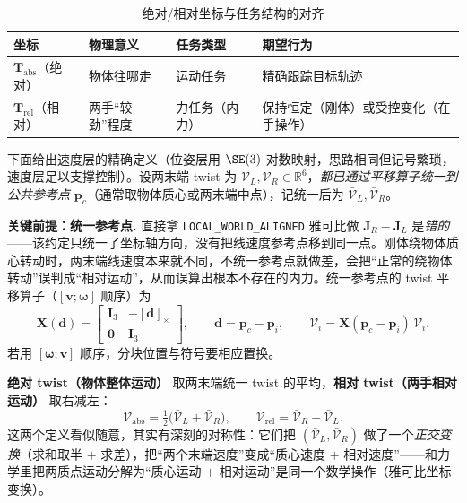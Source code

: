 \begin{table}[H]\centering\small
\caption{绝对/相对坐标与任务结构的对齐}
\label{tab:ma-absrel}
\begin{tabular}{llll}
\toprule
坐标 & 物理意义 & 任务类型 & 期望行为 \\
\midrule
$\mathbf{T}_{\text{abs}}$（绝对） & 物体往哪走 & 运动任务 & 精确跟踪目标轨迹 \\
$\mathbf{T}_{\text{rel}}$（相对） & 两手“较劲”程度 & 力任务（内力） & 保持恒定（刚体）或受控变化（在手操作） \\
\bottomrule
\end{tabular}
\end{table}

下面给出速度层的精确定义（位姿层用 $\SE(3)$ 对数映射，思路相同但记号繁琐，速度层足以支撑控制）。设两末端 twist 为 $\boldsymbol{\mathcal{V}}_L,\boldsymbol{\mathcal{V}}_R\in\mathbb{R}^6$，\emph{都已通过平移算子统一到公共参考点} $\mathbf{p}_c$（通常取物体质心或两末端中点），记统一后为 $\bar{\boldsymbol{\mathcal{V}}}_L,\bar{\boldsymbol{\mathcal{V}}}_R$。

\begin{note}
\textbf{关键前提：统一参考点.}\;
直接拿 \verb|LOCAL_WORLD_ALIGNED| 雅可比做 $\mathbf{J}_R-\mathbf{J}_L$ 是\emph{错的}——该约定只统一了坐标轴方向，没有把线速度参考点移到同一点。刚体绕物体质心转动时，两末端线速度本来就不同，不统一参考点就做差，会把“正常的绕物体转动”误判成“相对运动”，从而误算出根本不存在的内力。统一参考点的 twist 平移算子（$[\mathbf{v};\boldsymbol{\omega}]$ 顺序）为
\[
  \mathbf{X}(\mathbf{d})=\begin{bmatrix}\mathbf{I}_3 & -[\mathbf{d}]_\times\\ \mathbf{0} & \mathbf{I}_3\end{bmatrix},\qquad
  \mathbf{d}=\mathbf{p}_c-\mathbf{p}_i,\qquad \bar{\boldsymbol{\mathcal{V}}}_i=\mathbf{X}(\mathbf{p}_c-\mathbf{p}_i)\,\boldsymbol{\mathcal{V}}_i.
\]
若用 $[\boldsymbol{\omega};\mathbf{v}]$ 顺序，分块位置与符号要相应置换。
\end{note}

\textbf{绝对 twist（物体整体运动）} 取两末端统一 twist 的平均，\textbf{相对 twist（两手相对运动）} 取右减左：
\begin{equation}
  \boldsymbol{\mathcal{V}}_{\text{abs}}=\tfrac12\big(\bar{\boldsymbol{\mathcal{V}}}_L+\bar{\boldsymbol{\mathcal{V}}}_R\big),
  \qquad
  \boldsymbol{\mathcal{V}}_{\text{rel}}=\bar{\boldsymbol{\mathcal{V}}}_R-\bar{\boldsymbol{\mathcal{V}}}_L.
  \label{eq:ma-absrel-twist}
\end{equation}
这两个定义看似随意，其实有深刻的对称性：它们把 $(\bar{\boldsymbol{\mathcal{V}}}_L,\bar{\boldsymbol{\mathcal{V}}}_R)$ 做了一个\emph{正交变换}（求和取半 $+$ 求差），把“两个末端速度”变成“质心速度 $+$ 相对速度”——和力学里把两质点运动分解为“质心运动 $+$ 相对运动”是同一个数学操作（雅可比坐标变换）。

